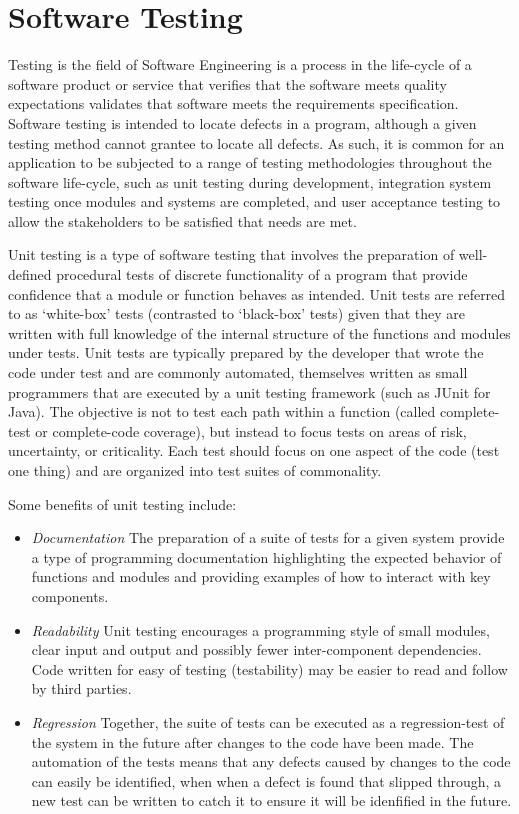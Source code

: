 \documentclass[a4paper, 11pt]{article}
\begin{document}
%
%
\section{Software Testing}
\label{sec:testing}
Testing is the field of Software Engineering is a process in the life-cycle of a software product or service that verifies that the software meets quality expectations validates that software meets the requirements specification. Software testing is intended to locate defects in a program, although a given testing method cannot grantee to locate all defects. As such, it is common for an application to be subjected to a range of testing methodologies throughout the software life-cycle, such as unit testing during development, integration system testing once modules and systems are completed, and user acceptance testing to allow the stakeholders to be satisfied that needs are met.

Unit testing is a type of software testing that involves the preparation of well-defined procedural tests of discrete functionality of a program that provide confidence that a module or function behaves as intended. Unit tests are referred to as `white-box' tests (contrasted to `black-box' tests) given that they are written with full knowledge of the internal structure of the functions and modules under tests. Unit tests are typically prepared by the developer that wrote the code under test and are commonly automated, themselves written as small programmers that are executed by a unit testing framework (such as JUnit for Java). The objective is not to test each path within a function (called complete-test or complete-code coverage), but instead to focus tests on areas of risk, uncertainty, or criticality. Each test should focus on one aspect of the code (test one thing) and are organized into test suites of commonality. 

Some benefits of unit testing include:

\begin{itemize}
  \item \emph{Documentation} The preparation of a suite of tests for a given system provide a type of programming documentation highlighting the expected behavior of functions and modules and providing examples of how to interact with key components.
  \item \emph{Readability} Unit testing encourages a programming style of small modules, clear input and output and possibly fewer inter-component dependencies. Code written for easy of testing (testability) may be easier to read and follow by third parties.
  \item \emph{Regression} Together, the suite of tests can be executed as a regression-test of the system in the future after changes to the code have been made. The automation of the tests means that any defects caused by changes to the code can easily be identified, when when a defect is found that slipped through, a new test can be written to catch it to ensure it will be idenfified in the future.
\end{itemize}
\end{document}
